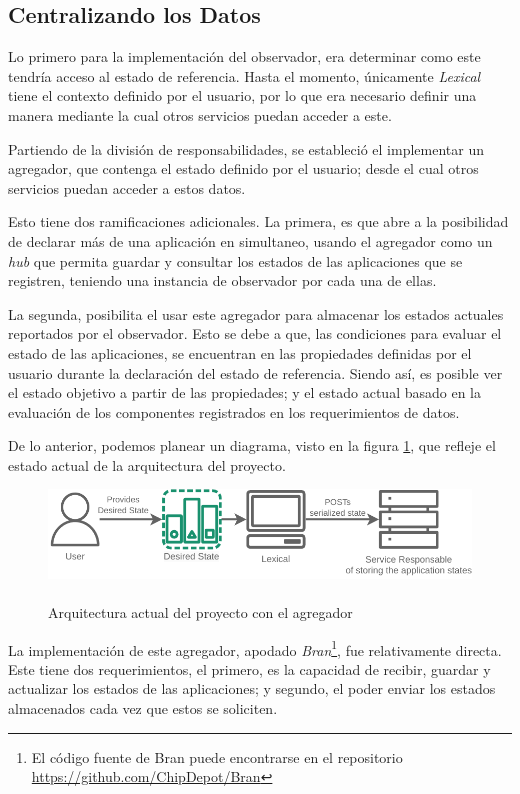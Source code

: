 \subsection{Centralizando los Datos} \label{sec:Centering}

Lo primero para la implementación del observador, era determinar como este tendría acceso al estado de referencia. Hasta el momento, únicamente \textit{Lexical} tiene el contexto definido por el usuario, por lo que era necesario definir una manera mediante la cual otros servicios puedan acceder a este.

Partiendo de la división de responsabilidades, se estableció el implementar un agregador, que contenga el estado definido por el usuario; desde el cual otros servicios puedan acceder a estos datos. 

Esto tiene dos ramificaciones adicionales. La primera, es que abre a la posibilidad de declarar más de una aplicación en simultaneo, usando el agregador como un \textit{hub} que permita guardar y consultar los estados de las aplicaciones que se registren, teniendo una instancia de observador por cada una de ellas.

La segunda, posibilita el usar este agregador para almacenar los estados actuales reportados por el observador. Esto se debe a que, las condiciones para evaluar el estado de las aplicaciones, se encuentran en las propiedades definidas por el usuario durante la declaración del estado de referencia. Siendo así, es posible ver el estado objetivo a partir de las propiedades; y el estado actual basado en la evaluación de los componentes registrados en los requerimientos de datos.

De lo anterior, podemos planear un diagrama, visto en la figura \ref{fig:StarDuckMini}, que refleje el estado actual de la arquitectura del proyecto.

\begin{figure}[ht]
    \centering
    \caption{\\Arquitectura actual del proyecto con el agregador}
    \label{fig:StarDuckMini}
    \includegraphics[width=0.9\linewidth]{images/StarDuckMini.pdf}
\end{figure}

La implementación de este agregador, apodado \textit{Bran}\footnote{El código fuente de Bran puede encontrarse en el repositorio \url{https://github.com/ChipDepot/Bran}}, fue relativamente directa. Este tiene dos requerimientos, el primero, es la capacidad de recibir, guardar y actualizar los estados de las aplicaciones; y segundo, el poder enviar los estados almacenados cada vez que estos se soliciten.

